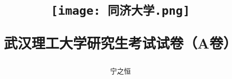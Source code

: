 \def\myTitle{\heiti 武汉理工大学研究生考试试卷（A卷）}
\def\myAuthor{宁之恒}
% 


\title{
    \begin{figure}[!h]
        \centering
        \texttt{[image: 同济大学.png]}
        \label{同济大学}
    \end{figure}

    {\Huge{\textbf{\myTitle}}}}
\author{\myAuthor}
\date{}
\maketitle




